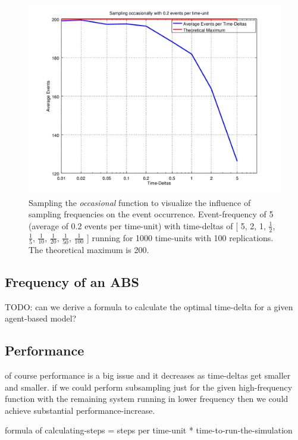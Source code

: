 \begin{figure}
	\centering
	\includegraphics[width=.6\textwidth, angle=0]{./../shared/fig/samplingTest_occasionally_02evts.png}
	\caption{Sampling the \textit{occasional} function to visualize the influence of sampling frequencies on the event occurrence. Event-frequency of 5 (average of 0.2 events per time-unit) with time-deltas of [ 5, 2, 1, $\frac{1}{2}$, $\frac{1}{5}$, $\frac{1}{10}$, $\frac{1}{20}$, $\frac{1}{50}$, $\frac{1}{100}$ ] running for 1000 time-units with 100 replications. The theoretical maximum is 200.}
	\label{fig:sampling_occasionally_02evts}
\end{figure}

\subsection{Frequency of an ABS}
TODO: can we derive a formula to calculate the optimal time-delta for a given agent-based model?

\subsection{Performance}
of course performance is a big issue and it decreases as time-deltas get smaller and smaller. if we could perform subsampling just for the given high-frequency function with the remaining system running in lower frequency then we could achieve substantial performance-increase.

formula of calculating-steps = steps per time-unit * time-to-run-the-simulation